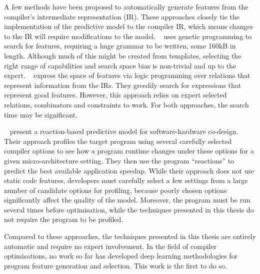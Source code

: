 A few methods have been proposed to automatically generate features from the compiler's intermediate representation (IR). These approaches closely tie the implementation of the predictive model to the compiler IR, which means changes to the IR will require modifications to the model.
\citeauthor{Leather2014}~\cite{Leather2014} uses genetic programming to search for features, requiring a huge grammar to be written, some 160kB in length. Although much of this might be created from templates, selecting the right range of capabilities and search space bias is non-trivial and up to the expert.
\citeauthor{Namolaru2010a}~\cite{Namolaru2010a} express the space of features via logic programming over relations that represent information from the IRs. They greedily search for expressions that represent good features. However, this approach relies on expert selected relations, combinators and constraints to work. For both approaches, the search time may be significant.

\citeauthor{Cavazos2006}~\cite{Cavazos2006} present a reaction-based predictive model for software-hardware co-design. Their approach profiles the target program using several carefully selected compiler options to see how a program runtime changes under these options for a given micro-architecture setting. They then use the program ``reactions'' to predict the best available application speedup. While their approach does not use static code features, developers must carefully select a few settings from a large number of candidate options for profiling, because poorly chosen options significantly affect the quality of the model. Moreover, the program must be run several times before optimisation, while the techniques presented in this thesis do not require the program to be profiled.

Compared to these approaches, the techniques presented in this thesis are entirely automatic and require no expert involvement. In the field of compiler optimisations, no work so far has developed deep learning methodologies for program feature generation and selection. This work is the first to do so.


